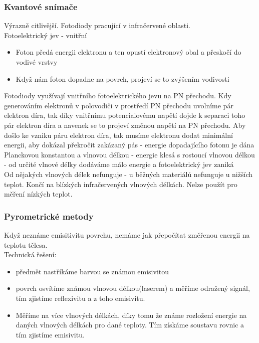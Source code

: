 \subsubsection*{Kvantové snímače}
Výrazně citlivější. Fotodiody pracující v infračervené oblasti.\\
Fotoelektrický jev - vnitřní
\begin{itemize}
    \item Foton předá energii elektronu a ten opustí elektronový obal a přeskočí do vodivé vrstvy
    \item Když nám foton dopadne na povrch, projeví se to zvýšením vodivosti
\end{itemize}
Fotodiody využívají vnitřního fotoelektrického jevu na PN přechodu. Kdy generováním elektronů v polovodiči v prostředí PN přechodu uvolníme pár elektron díra, tak díky vnitřnímu potencialovému napětí dojde k separaci toho pár elektron díra a navenek se to projeví změnou napětí na PN přechodu. Aby došlo ke vzniku páru elektron díra, tak musíme elektronu dodat minimální energii, aby dokázal překročit zakázaný pás - energie dopadajícího fotonu je dána Planckovou konstantou a vlnovou délkou - energie klesá s rostoucí vlnovou délkou - od určité vlnové délky dodáváme málo energie a fotoelektrický jev zaniká\\
Od nějakých vlnových délek nefunguje - u běžných materiálů nefunguje u nižších teplot. Končí na blízkých infračervených vlnových délkách. Nelze použít pro měření nízkých teplot.\\

\subsubsection*{Pyrometrické metody}
Když neznáme emisitivitu povrchu, nemáme jak přepočítat změřenou energii na teplotu tělesa.\\
Technická řešení:
\begin{itemize}
    \item předmět nastříkáme barvou se známou emisivitou
    \item povrch osvítíme známou vlnovou délkou(laserem) a měříme odražený signál, tím zjistíme reflexivitu a z toho emisivitu.
    \item Měříme na více vlnových délkách, díky tomu že známe rozložení energie na daných vlnových délkách pro dané teploty. Tím získáme soustavu rovnic a tím zjistíme emisivitu.
\end{itemize}

